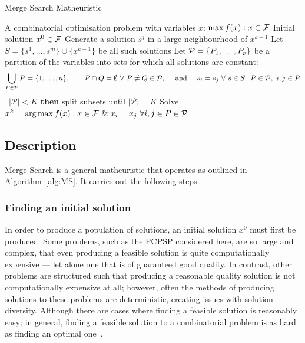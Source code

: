 \documentclass[journal]{IEEEtran}
\begin{document}
\begin{algorithm}[htb!]
\caption{{\sf Merge Search Matheuristic}} \label{alg:MS}
\begin{algorithmic}[1]
  \Require A combinatorial optimisation problem with variables $x$: $\max f(x) : x\in {\cal F}$
  \Require Initial solution $x^0\in \cal F$
    \State Generate a solution $s^j$ in a large neighbourhood of $x^{k-1}$
    \label{step:nbhd}
      \EndFor
    \State Let  $S=\{s^1,\ldots,s^m\}\cup\{x^{k-1}\}$ be all such solutions
    \State Let ${\cal P}=\{P_1,\ldots,P_p\}$ be a partition of the variables into sets for which all solutions are constant:\label{step:P}
  $$ \bigcup_{P\in {\cal P}} P=\{1,\ldots,n\},\qquad P \cap Q=\emptyset\ \forall\ P\ne Q\in
  {\cal P},\quad \text{ and }\quad
  s_i = s_j \ \forall\ s\in S,\ P\in {\cal P},\ i,j\in P$$
   \ {$|\mathcal{P}| < K$} {\bf then} split subsets until $|\mathcal{P}|=K$ \label{step:RandSplit}
  \State Solve $x^k=\text{arg}\max f(x) : x\in {\cal F}\ \&\ x_i=x_j\ \forall
  i,j\in P\in{\cal P}$\label{step:merge}
\EndFor
\end{algorithmic}
\end{algorithm}

\subsection{Description}
Merge Search is a general matheuristic that operates
as outlined in Algorithm~\ref{alg:MS}. It carries out the following steps:

\subsubsection*{Finding an initial solution}
In order to produce a population of solutions, an initial solution $x^0$ must first be produced.
Some problems, such as the PCPSP considered here, are so large and complex, that even producing a feasible solution is quite computationally expensive --- let alone one that is of guaranteed good quality. In contrast, other problems are structured such that producing a reasonable quality solution is not computationally expensive at all; however, often the methods of producing solutions to these problems are deterministic, creating issues with solution diversity. Although there are cases where finding a feasible solution is reasonably easy; in general, finding a feasible solution to a combinatorial problem is as hard as finding an optimal one~\cite{Papadimitriou1982}.
\end{document}
